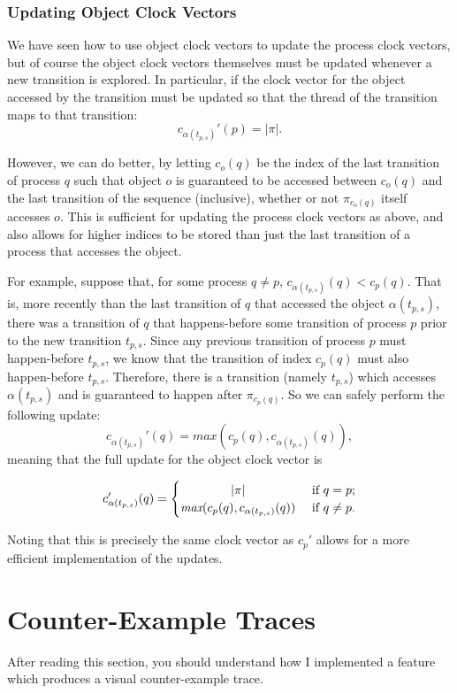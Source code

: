 \documentclass[12pt,a4paper,twoside,openright]{report}
\begin{document}
\subsubsection{Updating Object Clock Vectors}

We have seen how to use object clock vectors to
update the process clock vectors, but of course
the object clock vectors themselves must be
updated whenever a new transition is explored.
In particular, if the clock vector for the
object accessed by the transition must be
updated so that the thread of the transition
maps to that transition:
\[c_{\alpha(t_{p,s})}'(p) = |\pi|.\]

However, we can do better, by letting
$c_o(q)$ be the index of the
last transition of process
$q$ such that object $o$ is guaranteed to be
accessed between $c_o(q)$ and the last
transition of the sequence (inclusive),
whether or not $\pi_{c_o(q)}$ itself
accesses $o$.
This is sufficient for updating the
process clock vectors as above, and
also allows for higher indices to
be stored than just the last
transition of a process that
accesses the object.

For example, suppose that,
for some process $q \neq p$,
$c_{\alpha(t_{p,s})}(q) < c_p(q)$. That is,
more recently than the last transition of
$q$ that accessed the object $\alpha(t_{p,s})$,
there was a transition of $q$ that happens-before
some transition of process $p$ prior to the new
transition $t_{p,s}$. Since any previous
transition of process $p$ must happen-before
$t_{p,s}$, we know that the transition
of index $c_p(q)$ must also happen-before
$t_{p,s}$. Therefore, there is a transition
(namely $t_{p,s}$) which
accesses $\alpha(t_{p,s})$ and is guaranteed
to happen after $\pi_{c_p(q)}$. So we can
safely perform the following update:
\[ c_{\alpha(t_{p,s})}'(q) =\textit{max}(c_p(q),
c_{\alpha(t_{p,s})}(q)),
\]
meaning that the full update for the object
clock vector is

\[ c_{\alpha(t_{p,s})}'(q) =
\begin{cases}
\hfill |\pi| \hfill & \text{ if } q = p; \\
\hfill \textit{max}(c_p(q),
c_{\alpha(t_{p,s})}(q))
\hfill & \text{ if } q \neq p.
\end{cases}\]

Noting that this is precisely the same
clock vector as $c_p'$ allows for a
more efficient implementation of
the updates.

\section{Counter-Example Traces} \label{sec:traces}
After reading this section, you should understand
how I implemented a feature which produces a
visual counter-example trace.
\end{document}
